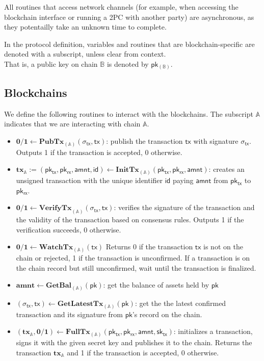 \documentclass{article}      	%
\begin{document}
All routines that access network channels (for example, when accessing the blockchain interface or running a 2PC with another party) are asynchronous, as they potentailly take an unknown time to complete.

In the protocol definition, variables and routines that are blockchain-specific are denoted with a subscript, unless clear from context. \\
That is, a public key on chain $\mathbb{B}$ is denoted by $\mathsf{pk_{(\mathbb{B})}}$. \\

\subsection{Blockchains}

We define the following routines to interact with the blockchains. The subscript $\mathbb{A}$ indicates that we are interacting with chain $\mathbb{A}$.

\begin{itemize}[topsep=0pt, itemsep=0pt, leftmargin=2em]
    \item $\mathbf{0/1} \gets \mathbf{PubTx}_{(\mathbb{A})}(\sigma_{\mathsf{tx}}, \mathsf{tx})$: publish the transaction $\mathsf{tx}$ with signature $\sigma_{\mathsf{tx}}$. Outputs 1 if the transaction is accepted, 0 otherwise.
    \item $\mathbf{tx}_{\mathbb{A}} := (\mathsf{pk_{tx}}, \mathsf{pk_{rx}}, \mathsf{amnt}, \mathsf{id})  \gets \mathbf{InitTx}_{(\mathbb{A})}(\mathsf{pk_{tx}}, \mathsf{pk_{rx}}, \mathsf{amnt})$: creates an unsigned transaction with the unique identifier $\mathsf{id}$ paying $\mathsf{amnt}$ from $\mathsf{pk_{tx}}$ to $\mathsf{pk_{rx}}$.
    \item $\mathbf{0/1} \gets \mathbf{VerifyTx}_{(\mathbb{A})}(\sigma_{\mathsf{tx}}, \mathsf{tx})$: verifies the signature of the transaction and the validity of the transaction based on consensus rules. Outputs 1 if the verification succeeds, 0 otherwise.
    \item $\mathbf{0/1} \gets \mathbf{WatchTx}_{(\mathbb{A})}(\mathsf{tx})$ Returns 0 if the transaction $\mathsf{tx}$ is not on the chain or rejected, 1 if the transaction is unconfirmed. If a transaction is on the chain record but still unconfirmed, wait until the transaction is finalized.
    \item $\mathbf{amnt} \gets \mathbf{GetBal}_{(\mathbb{A})}(\mathsf{pk})$: get the balance of assets held by $\mathsf{pk}$
    \item $(\sigma_{\mathsf{tx}}, \mathsf{tx}) \gets \mathbf{GetLatestTx}_{(\mathbb{A})}(\mathsf{pk})$: get the the latest confirmed transaction and its signature from $\mathsf{pk}$'s record on the chain.
    \item $(\mathbf{tx}_{\mathbb{A}}, \mathbf{0/1})  \gets \mathbf{FullTx}_{(\mathbb{A})}(\mathsf{pk_{tx}}, \mathsf{pk_{rx}}, \mathsf{amnt}, \mathsf{sk_{tx}})$: initializes a transaction, signs it with the given secret key and publishes it to the chain. Returns the transaction $\mathbf{tx}_{\mathbb{A}}$ and 1 if the transaction is accepted, 0 otherwise.
\end{itemize}
\end{document}
